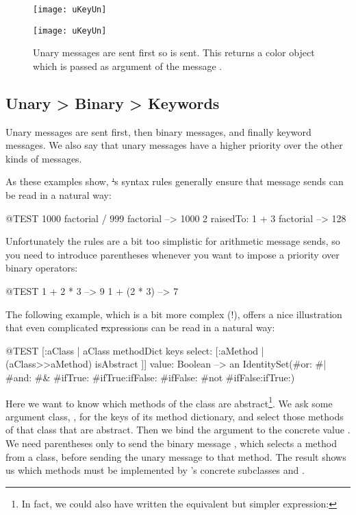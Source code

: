 \documentclass[a4paper,10pt,twoside]{book}
\begin{document}
\begin{figure}[ht]
\ifluluelse
	{\centerline{\texttt{[image: uKeyUn]}} }
	{\centerline{\texttt{[image: uKeyUn]}} }
\caption{Unary messages are sent first so  is sent. This returns a color object which is passed as argument of the message .}
\end{figure}

\subsection*{Unary > Binary > Keywords}
Unary messages are sent first, then binary messages, and finally keyword messages. We also say that unary messages have a higher  priority over the other kinds of messages.


As these examples show, \st's syntax rules generally ensure that message sends can be read in a natural way:
\begin{code}{@TEST}
1000 factorial / 999 factorial --> 1000
2 raisedTo: 1 + 3 factorial     --> 128
\end{code}
\noindent

Unfortunately the rules are a bit too simplistic for arithmetic message sends, so you need to introduce parentheses whenever you want to impose a priority over binary operators:
\begin{code}{@TEST}
1 + 2 * 3   --> 9
1 + (2 * 3) --> 7
\end{code}

The following example, which is a bit more complex (!), offers a nice illustration that even complicated \st expressions can be read in a natural way:
\begin{code}{@TEST}
[:aClass | aClass methodDict keys select: [:aMethod | (aClass>>aMethod) isAbstract ]] value: Boolean --> an IdentitySet(#or: #| #and: #& #ifTrue: #ifTrue:ifFalse: #ifFalse: #not #ifFalse:ifTrue:)
\end{code}
\noindent
Here we want to know which methods of the  class are abstract\footnote{In fact, we could also have written the equivalent but simpler expression: }.
We ask some argument class, , for the keys of its method dictionary, and select those methods of that class that are abstract.
Then we bind the argument  to the concrete value .
We need parentheses only to send the binary message \ct{>>}, which selects a method from a class, before sending the unary message \mbox{} to that method. The result shows us which methods must be implemented by 's concrete subclasses  and .
\end{document}
